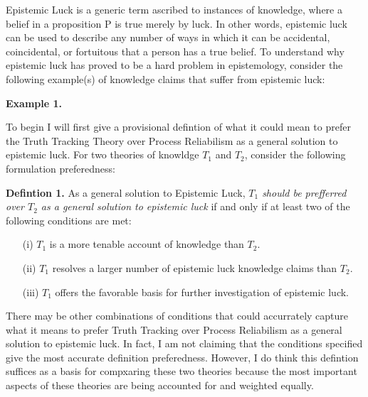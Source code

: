\documentclass{article}
\begin{document}
Epistemic Luck is a generic term ascribed to instances of knowledge, where a belief in a proposition P is true merely by luck. In other words,
epistemic luck can be used to describe any number of ways in which it can be
accidental, coincidental, or fortuitous that a person has a true belief. To understand
why epistemic luck has proved to be a hard problem in epistemology, consider
the following example(s) of knowledge claims that suffer from epistemic luck:

\begin{displayquote}
\textbf{Example 1.}
\end{displayquote}


To begin I will first give a provisional defintion of what it could mean to
prefer the Truth Tracking Theory over Process Reliabilism as a general solution to
epistemic luck. For two theories of knowldge $T_{1}$ and $T_{2}$, consider the
following formulation preferedness:
\begin{displayquote}
    \textbf{Defintion 1.} As a general solution to Epistemic Luck,
    \textit{$T_{1}$ should be prefferred over $T_{2}$ as a general solution
    to epistemic luck} if and only if at least two of the following conditions are met:
    \begin{enumerate}
        \item[(i)] $T_{1}$ is a more tenable account of knowledge than $T_{2}$.
        \item[(ii)] $T_{1}$ resolves a larger number of epistemic luck knowledge claims than $T_{2}$.
        \item[(iii)] $T_{1}$ offers the favorable basis for further investigation of epistemic luck.
    \end{enumerate}
\end{displayquote}
  There may be other combinations of conditions that could accurrately capture
what it means to prefer Truth Tracking over Process Reliabilism as a general
solution to epistemic luck. In fact, I am not claiming that the conditions
specified give the most accurate definition preferedness. However, I do think
this defintion suffices as a basis for compxaring these two theories because
the most important aspects of these theories are being accounted for and weighted
equally.

\end{document}
